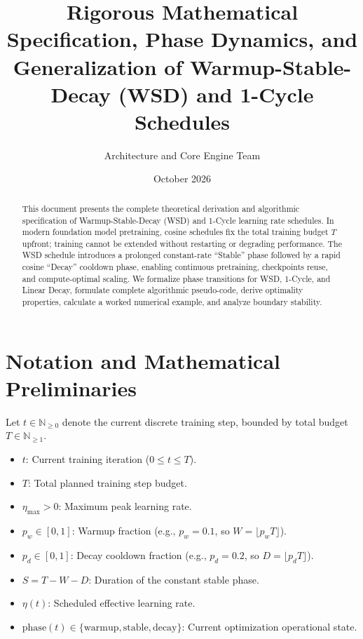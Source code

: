 \documentclass[11pt,a4paper]{article}
\title{\textbf{Rigorous Mathematical Specification, Phase Dynamics, and Generalization of Warmup-Stable-Decay (WSD) and 1-Cycle Schedules}}
\author{Architecture and Core Engine Team}
\date{October 2026}
\theoremstyle{definition}
\begin{document}
\maketitle

\begin{abstract}
This document presents the complete theoretical derivation and algorithmic specification of Warmup-Stable-Decay (WSD) and 1-Cycle learning rate schedules. In modern foundation model pretraining, cosine schedules fix the total training budget $T$ upfront; training cannot be extended without restarting or degrading performance. The WSD schedule introduces a prolonged constant-rate ``Stable'' phase followed by a rapid cosine ``Decay'' cooldown phase, enabling continuous pretraining, checkpoints reuse, and compute-optimal scaling. We formalize phase transitions for WSD, 1-Cycle, and Linear Decay, formulate complete algorithmic pseudo-code, derive optimality properties, calculate a worked numerical example, and analyze boundary stability.
\end{abstract}

\section{Notation and Mathematical Preliminaries}

Let $t \in \mathbb{N}_{\ge 0}$ denote the current discrete training step, bounded by total budget $T \in \mathbb{N}_{\ge 1}$.

\begin{itemize}
    \item $t$: Current training iteration ($0 \le t \le T$).
    \item $T$: Total planned training step budget.
    \item $\eta_{\max} > 0$: Maximum peak learning rate.
    \item $p_w \in [0, 1]$: Warmup fraction (e.g., $p_w = 0.1$, so $W = \lfloor p_w T \rfloor$).
    \item $p_d \in [0, 1]$: Decay cooldown fraction (e.g., $p_d = 0.2$, so $D = \lfloor p_d T \rfloor$).
    \item $S = T - W - D$: Duration of the constant stable phase.
    \item $\eta(t)$: Scheduled effective learning rate.
    \item $\text{phase}(t) \in \{\text{warmup}, \text{stable}, \text{decay}\}$: Current optimization operational state.
\end{itemize}
\end{document}
